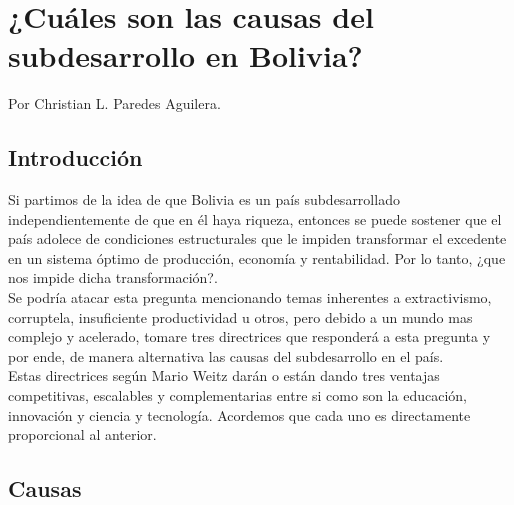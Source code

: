 \documentclass[10pt]{book}
\begin{document}
 

\chapter*{¿Cuáles son las causas del subdesarrollo en Bolivia?}

\begin{center}
Por Christian L. Paredes Aguilera.
\end{center}

\vspace{1.5cm}

\begin{multicols}{2}

\section*{Introducción}
Si partimos de la idea de que Bolivia es un país subdesarrollado independientemente de que en él haya riqueza, entonces se puede sostener que el país adolece de condiciones estructurales que le impiden transformar el excedente en un sistema óptimo de producción, economía y rentabilidad. Por lo tanto, ¿que nos impide dicha transformación?.\\
Se podría atacar esta pregunta mencionando temas inherentes a extractivismo, corruptela, insuficiente productividad  u otros, pero debido a un mundo mas complejo y acelerado, tomare tres directrices que responderá a esta pregunta y por ende, de manera alternativa las causas del subdesarrollo en el país.\\
Estas directrices según Mario Weitz darán o están dando tres ventajas competitivas, escalables y complementarias entre si como son la educación, innovación y ciencia y tecnología. Acordemos que cada uno es directamente proporcional al anterior.

\section*{Causas}


\end{multicols}
\end{document}
